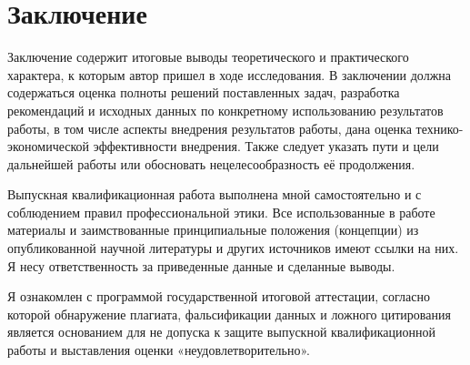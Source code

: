 \chapter*{Заключение}

Заключение содержит итоговые выводы теоретического и практического характера, к которым автор пришел в ходе исследования. В заключении должна содержаться оценка полноты решений поставленных задач, разработка рекомендаций и исходных данных по конкретному использованию результатов работы, в том числе аспекты внедрения результатов работы, дана оценка технико-экономической эффективности внедрения. Также следует указать пути и цели дальнейшей работы или обосновать нецелесообразность её продолжения.

Выпускная квалификационная работа выполнена мной самостоятельно и с соблюдением правил профессиональной этики. Все использованные в работе материалы и заимствованные принципиальные положения (концепции) из опубликованной научной литературы и других источников имеют ссылки на них. Я несу ответственность за приведенные данные и сделанные выводы. 

Я ознакомлен с программой государственной итоговой аттестации, согласно которой обнаружение плагиата, фальсификации данных и ложного цитирования является основанием для не допуска к защите выпускной квалификационной работы и выставления оценки «неудовлетворительно». 

\begin{center}
	\begin{minipage}[b]{0.35\textwidth}
		\studentfiotemplate
	\end{minipage}
	\hspace{25mm}
	\begin{minipage}[b]{0.35\textwidth}
        \studentsigntemplate
	\end{minipage}
\end{center}

\begin{minipage}{0.35\textwidth}
        \vspace{1.02cm}
        \studentdatetemplate
\end{minipage}

